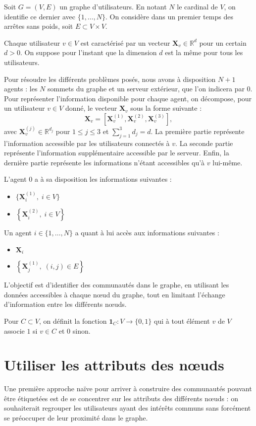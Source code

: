 \documentclass[a4paper]{article}
\begin{document}
Soit $G = (V, E)$ un graphe d'utilisateurs. En notant $N$ le cardinal de $V$, on
identifie ce dernier avec $\{1,\ldots,N\}$. On considère dans un premier temps
des arrêtes sans poids, soit $E \subset V \times V$.

Chaque utilisateur $v \in V$ est caractérisé par un vecteur
$\mathbf{X}_v \in \mathbb{R}^d$ pour un certain $d > 0$. On suppose pour l'instant
que la dimension $d$ est la même pour tous les utilisateurs.

Pour résoudre les différents problèmes posés, nous avons à disposition
$N + 1$ agents : les $N$ sommets du graphe et un serveur extérieur, que l'on
indicera par $0$. Pour représenter l'information disponible pour chaque agent,
on décompose, pour un utilisateur $v \in V$ donné, le vecteur $\mathbf{X}_v$ sous
la forme suivante :
\[
    \mathbf{X}_v = \left[ \mathbf{X}_v^{(1)}, \mathbf{X}_v^{(2)}, \mathbf{X}_v^{(3)} \right],
\]
avec $\mathbf{X}_v^{(j)} \in \mathbb{R}^{d_j}$ pour $1 \leq j \leq 3$ et $\sum_{j=1}^3 d_j = d$.
La première partie représente l'information accessible par les utilisateurs
connectés à $v$. La seconde partie représente l'information supplémentaire
accessible par le serveur. Enfin, la dernière partie représente les informations
n'étant accessibles qu'à $v$ lui-même.

L'agent $0$ a à sa disposition les informations suivantes :
\begin{itemize}
    \item $\{\mathbf{X}_i^{(1)}, \; i \in V\}$
    \item $\left\{\mathbf{X}_i^{(2)}, \; i \in V \right\}$
\end{itemize}
Un agent $i \in \{1,\ldots,N\}$ a quant à lui accès aux informations suivantes :
\begin{itemize}
    \item $\mathbf{X}_i$
    \item $\left\{ \mathbf{X}_j^{(1)}, \; (i, j) \in E \right\}$
\end{itemize}

L'objectif est d'identifier des communautés dans le graphe, en utilisant les
données accessibles à chaque n\oe{}ud du graphe, tout en limitant l'échange
d'information entre les différents n\oe{}uds.

Pour $C \subset V$, on définit la fonction $\mathbf{1}_C : V \rightarrow \{0, 1\}$
qui à tout élément $v$ de $V$ associe $1$ si $v \in C$ et $0$ sinon.

\section{Utiliser les attributs des n\oe{}uds}
\label{sec:utiliser_attributs_noeuds}
Une première approche naïve pour arriver à construire des communautés
pouvant être \og{} étiquetées \fg est de se concentrer sur les attributs des différents
n\oe{}uds : on souhaiterait regrouper les utilisateurs ayant des intérêts communs
sans forcément se préoccuper de leur proximité dans le graphe.
\end{document}
